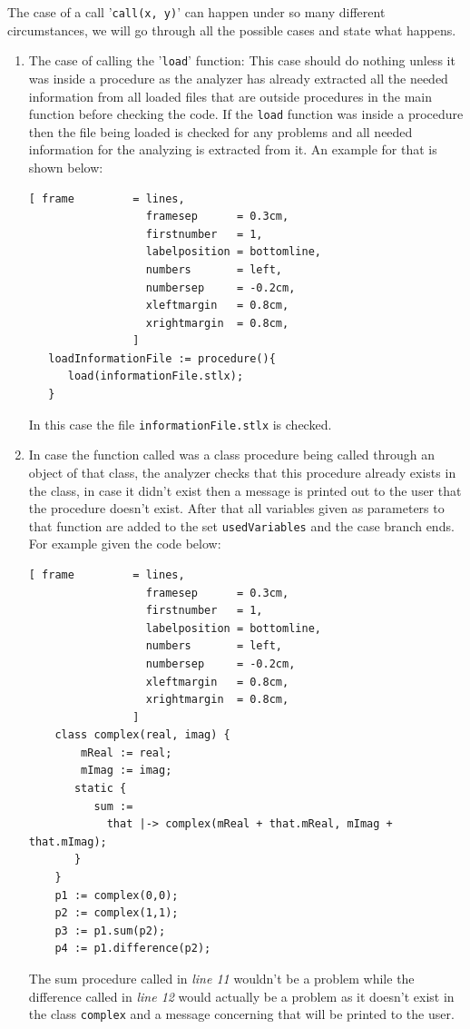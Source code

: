 \documentclass[11pt]{report}
\begin{document}
The case of a call '\texttt{call(x, y)}' can happen under so many different circumstances, we will go through all the possible cases and state what happens.

\begin{enumerate}

\item The case of calling the '\texttt{load}' function: This case should do nothing unless it was inside a procedure as the analyzer has already extracted all the needed information from all loaded files that are outside procedures in the main function before checking the code. If the \texttt{load} function was inside a procedure then the file being loaded is checked for any problems and all needed information for the analyzing is extracted from it. An example for that is shown below: 
\begin{Verbatim}[ frame         = lines, 
                  framesep      = 0.3cm, 
                  firstnumber   = 1,
                  labelposition = bottomline,
                  numbers       = left,
                  numbersep     = -0.2cm,
                  xleftmargin   = 0.8cm,
                  xrightmargin  = 0.8cm,
                ]
   loadInformationFile := procedure(){
      load(informationFile.stlx);
   }
\end{Verbatim}
In this case the file \texttt{informationFile.stlx} is checked.

\item In case the function called was a class procedure being called through an object of that class, the analyzer checks that this procedure already exists in the class, in case it didn't exist then a message is printed out to the user that the procedure doesn't exist. After that all variables given as parameters to that function are added to the set \texttt{usedVariables} and the case branch ends. For example given the code below:
\begin{Verbatim}[ frame         = lines, 
                  framesep      = 0.3cm, 
                  firstnumber   = 1,
                  labelposition = bottomline,
                  numbers       = left,
                  numbersep     = -0.2cm,
                  xleftmargin   = 0.8cm,
                  xrightmargin  = 0.8cm,
                ]
    class complex(real, imag) {
        mReal := real;
        mImag := imag;
       static {    
          sum := 
            that |-> complex(mReal + that.mReal, mImag + that.mImag);
       }
    }
    p1 := complex(0,0);
    p2 := complex(1,1);
    p3 := p1.sum(p2);
    p4 := p1.difference(p2);
\end{Verbatim}
The sum procedure called in \textsl{line 11} wouldn't be a problem while the difference called in \textsl{line 12} would actually be a problem as it doesn't exist in the class \texttt{complex} and a message concerning that will be printed to the user.


\end{enumerate}
\end{document}
